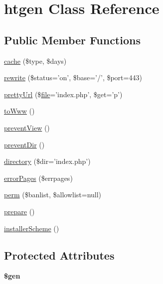 \hypertarget{classhtgen}{\section{htgen Class Reference}
\label{classhtgen}
}
\subsection*{Public Member Functions}
\begin{DoxyCompactItemize}
\item 
\hyperlink{classhtgen_a1d6ceb16d5b8ea6fd0e63ed03fde08d6}{cache} (\$type, \$days)
\item 
\hyperlink{classhtgen_a65662d62f9a7f5cd8bb3231aab42d948}{rewrite} (\$status='on', \$base='/', \$port=443)
\item 
\hyperlink{classhtgen_a76ebf2197f307abdb469a204fb24f21d}{pretty\-Url} (\$\hyperlink{classfile}{file}='index.\-php', \$get='p')
\item 
\hyperlink{classhtgen_a0b653c241eea3d479e7db0464956cc6f}{to\-Www} ()
\item 
\hyperlink{classhtgen_a7652afa243aed18054692e9e88a7347b}{prevent\-View} ()
\item 
\hyperlink{classhtgen_aa332281d246627964c36fd68997f98dc}{prevent\-Dir} ()
\item 
\hyperlink{classhtgen_a8acc8015c9cebee7ff40ff3b53f6360b}{directory} (\$dir='index.\-php')
\item 
\hyperlink{classhtgen_a450764950725de9284c7f909799e2c53}{error\-Pages} (\$errpages)
\item 
\hyperlink{classhtgen_a8df2efbc6aa3369c95d10d2347dcc98f}{perm} (\$banlist, \$allowlist=null)
\item 
\hyperlink{classhtgen_a9596f1635d3c078fa06ab0166bcbb11b}{prepare} ()
\item 
\hyperlink{classhtgen_a2a87f7fcb6240f637cceb37d72abc457}{installer\-Scheme} ()
\end{DoxyCompactItemize}
\subsection*{Protected Attributes}
\begin{DoxyCompactItemize}
\item 
\hypertarget{classhtgen_a3fbefca2da7b7d4434ad26f7436c8ff2}{{\bfseries \$gen}}\label{classhtgen_a3fbefca2da7b7d4434ad26f7436c8ff2}

\end{DoxyCompactItemize}


